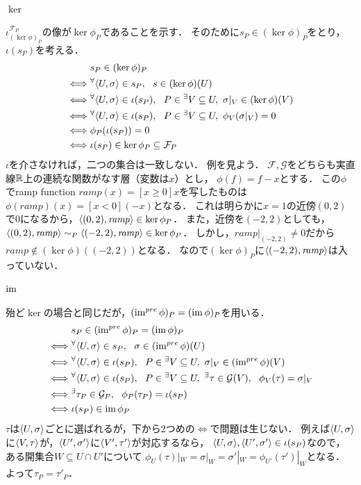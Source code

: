 \documentclass[a4paper]{jsarticle}
\newcommand{\shF}{\mathcal{F}}
\newcommand{\shG}{\mathcal{G}}
\begin{document}
    \paragraph{$\ker$}
    $\iota_{(\ker \phi)_P}^{\shF_P}$の像が$\ker \phi_P$であることを示す．
    そのために$s_P \in (\ker \phi)_P$をとり，$\iota(s_P)$を考える．
    \begin{align*}
        {}&     s_P \in (\ker \phi)_P \\
        \iff&   \Forall{\germ{U}{\sigma} \in s_P} s \in (\ker \phi)(U) \\
        \iff&   \Forall{\germ{U}{\sigma} \in \iota(s_P)} P \in {}^{\exists}{V} \subseteq U,~ \sigma|_V \in (\ker \phi)(V) \\
        \iff&   \Forall{\germ{U}{\sigma} \in \iota(s_P)} P \in {}^{\exists}{V} \subseteq U,~ \phi_V(\sigma|_V)=0 \\
        \iff&   \phi_P(\iota(s_P))=0 \\
        \iff&   \iota(s_P) \in \ker \phi_P \subseteq \shF_P
    \end{align*}
    $\iota$を介さなければ，二つの集合は一致しない．
    例を見よう．
    $\shF, \shG$をどちらも実直線$\mathbb{R}$上の連続な関数がなす層（変数は$x$）とし，
    $\phi(f)=f-x$とする．
    この$\phi$でramp function $\mathit{ramp}(x)=[x \geq 0]x$を写したものは
    $\phi(\mathit{ramp})(x)=[x<0](-x)$となる．
    これは明らかに$x=1$の近傍$(0,2)$で0になるから，$\langle (0,2),\mathit{ramp} \rangle \in \ker \phi_P$．
    また，近傍を$(-2,2)$としても，
    $\langle (0,2),\mathit{ramp} \rangle \sim_P \langle (-2,2),\mathit{ramp} \rangle \in \ker \phi_P$．
    しかし，$\mathit{ramp}|_{(-2,2)} \neq 0$だから
    $\mathit{ramp} \not \in (\ker \phi)((-2,2))$となる．
    なので$(\ker \phi)_P$に$\langle (-2,2),\mathit{ramp} \rangle$は入っていない．

    \paragraph{$\operatorname{im}$}
    殆ど$\ker$の場合と同じだが，$(\operatorname{im}^{pre} \phi)_P=(\operatorname{im} \phi)_P$を用いる．
    \begin{align*}
        {}&     s_P \in (\im^{pre} \phi)_P=(\im \phi)_P \\
        \iff&   \Forall{\germ{U}{\sigma} \in s_P} \sigma \in (\im^{pre} \phi)(U) \\
        \iff&   \Forall{\germ{U}{\sigma} \in \iota(s_P)} P \in {}^{\exists}{V} \subseteq U,~ \sigma|_V \in (\im^{pre} \phi)(V) \\
        \iff&   \Forall{\germ{U}{\sigma} \in \iota(s_P)} P \in {}^{\exists}{V} \subseteq U,~ \Exists{\tau \in \shG(V)} \phi_V(\tau)=\sigma|_V \\
        \iff&   \Exists{\tau_P \in \shG_P} \phi_P(\tau_P)=\iota(s_P) \\
        \iff&   \iota(s_P) \in \im \phi_P
    \end{align*}
    $\tau$は$\langle U,\sigma \rangle$ごとに選ばれるが，下から2つめの$\iff$で問題は生じない．
    例えば$\langle U,\sigma \rangle$に$\langle V,\tau \rangle$が，$\langle U',\sigma' \rangle$に$\langle V',\tau' \rangle$が対応するなら，
    $\langle U,\sigma \rangle, \langle U',\sigma' \rangle \in \iota(s_P)$なので，
    ある開集合$W \subseteq U \cap U'$について
    $\phi_{U}(\tau)|_W=\sigma|_{W}=\sigma'|_{W}=\phi_{U'}(\tau')|_W$となる．
    よって$\tau_P=\tau'_P$．
\end{document}
